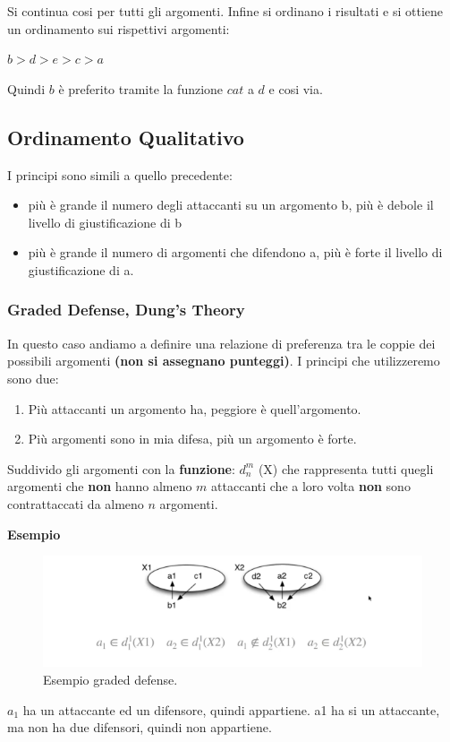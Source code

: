 \vspace{0.3cm}

Si continua cosi per tutti gli argomenti. Infine si ordinano i risultati e
si ottiene un ordinamento sui rispettivi argomenti:
\begin{center}
    $b>d>e>c>a$
\end{center}
Quindi $b$ è preferito tramite la funzione $cat$ a $d$ e cosi via.
\subsection{Ordinamento Qualitativo}
I principi sono simili a quello precedente:
\begin{itemize}
    \item più è grande il numero degli attaccanti su un argomento b, più è
          debole il livello di giustificazione di b
    \item più è grande il numero di argomenti che difendono a, più è forte
          il livello di giustificazione di a.
\end{itemize}
\subsubsection{Graded Defense, Dung's Theory}
In questo caso andiamo a definire una relazione di preferenza tra le coppie
dei possibili argomenti \textbf{(non si assegnano punteggi)}. I principi che
utilizzeremo sono due:
\begin{enumerate}
    \item Più attaccanti un argomento ha, peggiore è quell'argomento.
    \item Più argomenti sono in mia difesa, più un argomento è forte.

\end{enumerate}
Suddivido gli argomenti con la \textbf{funzione}: $d^m_n$ (X) che
rappresenta tutti quegli argomenti che \textbf{non} hanno almeno $m$
attaccanti che a loro volta \textbf{non} sono contrattaccati da almeno $n$
argomenti.

\vspace{0.3cm}

\textbf{Esempio}

\begin{figure}[htp]
    \centering
    \includegraphics[width=13cm, keepaspectratio]{img/Cap8/defense.png}
    \caption{Esempio graded defense.}
\end{figure}
$a_1$ ha un attaccante ed un difensore, quindi appartiene. a1 ha si un
attaccante, ma non ha due difensori, quindi non appartiene.

